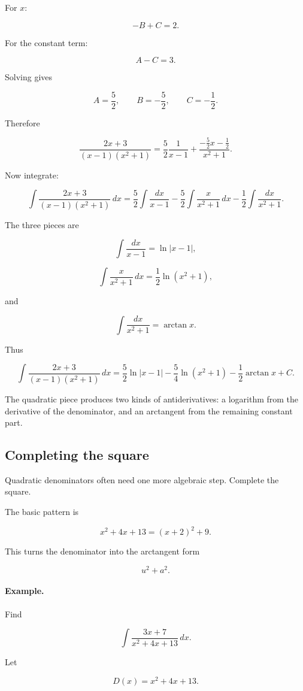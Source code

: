 For \(x\):

\[
-B+C=2.
\]

For the constant term:

\[
A-C=3.
\]

Solving gives

\[
A=\frac52,
\qquad
B=-\frac52,
\qquad
C=-\frac12.
\]

Therefore

\[
\frac{2x+3}{(x-1)(x^2+1)}
=
\frac{5}{2}\frac{1}{x-1}
+
\frac{-\frac52x-\frac12}{x^2+1}.
\]

Now integrate:

\[
\int \frac{2x+3}{(x-1)(x^2+1)}\,dx
=
\frac52\int\frac{dx}{x-1}
-\frac52\int\frac{x}{x^2+1}\,dx
-\frac12\int\frac{dx}{x^2+1}.
\]

The three pieces are

\[
\int\frac{dx}{x-1}=\ln|x-1|,
\]

\[
\int\frac{x}{x^2+1}\,dx=\frac12\ln(x^2+1),
\]

and

\[
\int\frac{dx}{x^2+1}=\arctan x.
\]

Thus

\[
\boxed{
\int \frac{2x+3}{(x-1)(x^2+1)}\,dx
=
\frac52\ln|x-1|
-
\frac54\ln(x^2+1)
-
\frac12\arctan x
+C.
}
\]

The quadratic piece produces two kinds of antiderivatives: a logarithm from the
derivative of the denominator, and an arctangent from the remaining constant part.

\subsection{Completing the square}
\label{subsec:completing-square-partial-fractions}

Quadratic denominators often need one more algebraic step.  Complete the square.

The basic pattern is

\[
x^2+4x+13=(x+2)^2+9.
\]

This turns the denominator into the arctangent form

\[
u^2+a^2.
\]

\paragraph{Example.}
Find

\[
\int \frac{3x+7}{x^2+4x+13}\,dx.
\]

Let

\[
D(x)=x^2+4x+13.
\]

